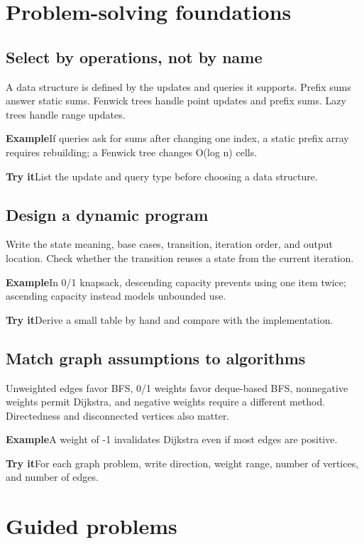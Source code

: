\documentclass[10pt,letterpaper]{article}
\newcommand{\entrylabel}[1]{\textcolor{accent}{\bfseries #1}}
\begin{document}
\section*{Problem-solving foundations}
\subsection*{Select by operations, not by name}
A data structure is defined by the updates and queries it supports. Prefix sums answer static sums. Fenwick trees handle point updates and prefix sums. Lazy trees handle range updates.\par
\begin{guidebox}\entrylabel{Example}\quad If queries ask for sums after changing one index, a static prefix array requires rebuilding; a Fenwick tree changes O(log n) cells.\par
\entrylabel{Try it}\quad List the update and query type before choosing a data structure.\end{guidebox}
\subsection*{Design a dynamic program}
Write the state meaning, base cases, transition, iteration order, and output location. Check whether the transition reuses a state from the current iteration.\par
\begin{guidebox}\entrylabel{Example}\quad In 0/1 knapsack, descending capacity prevents using one item twice; ascending capacity instead models unbounded use.\par
\entrylabel{Try it}\quad Derive a small table by hand and compare with the implementation.\end{guidebox}
\subsection*{Match graph assumptions to algorithms}
Unweighted edges favor BFS, 0/1 weights favor deque-based BFS, nonnegative weights permit Dijkstra, and negative weights require a different method. Directedness and disconnected vertices also matter.\par
\begin{guidebox}\entrylabel{Example}\quad A weight of -1 invalidates Dijkstra even if most edges are positive.\par
\entrylabel{Try it}\quad For each graph problem, write direction, weight range, number of vertices, and number of edges.\end{guidebox}
\clearpage\section*{Guided problems}
\end{document}

